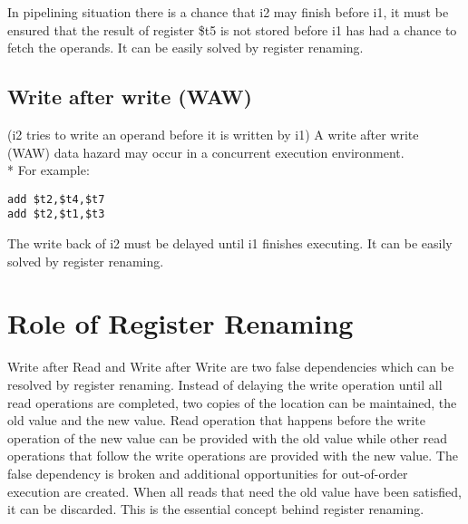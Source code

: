 In pipelining situation there is a chance that i2 may finish before i1, it must be ensured that the result of register \$t5 is not stored before i1 has had a chance to fetch the operands. It can be easily solved by register renaming.

\subsection{Write after write (WAW)}
(i2 tries to write an operand before it is written by i1) A write after write (WAW) data hazard may occur in a concurrent execution environment. \\*
For example:
\begin{lstlisting}
add $t2,$t4,$t7 
add $t2,$t1,$t3
\end{lstlisting}

The write back of i2 must be delayed until i1 finishes executing. It can be easily solved by register renaming.

\section{Role of Register Renaming}
Write after Read and Write after Write are two false dependencies which can be resolved by register renaming. Instead of delaying the write operation until all read operations are completed, two copies of the location can be maintained, the old value and the new value. Read operation that happens before the write operation of the new value can be provided with the old value while other read operations that follow the write operations are provided with the new value. The false dependency is broken and additional opportunities for out-of-order execution are created. When all reads that need the old value have been satisfied, it can be discarded. This is the essential concept behind register renaming.
